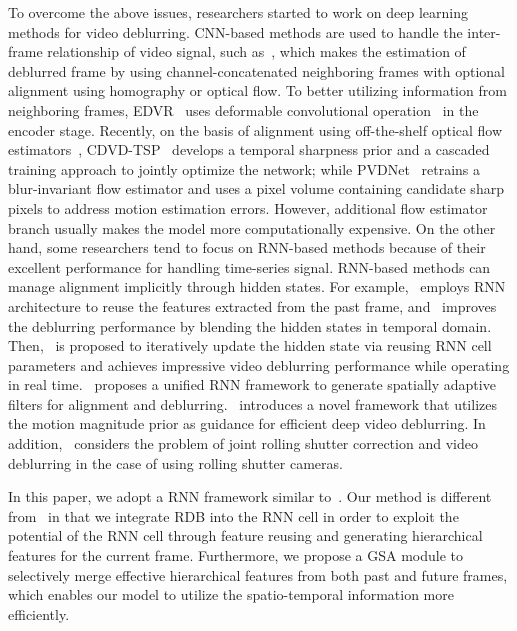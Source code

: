 \documentclass[twocolumn]{svjour3}          \smartqed  \usepackage{graphicx}
\begin{document}
To overcome the above issues, researchers started to work on deep learning methods for video deblurring. CNN-based methods are used to handle the inter-frame relationship of video signal, such as~\cite{su2017deep}, which makes the estimation of deblurred frame by using channel-concatenated neighboring frames with optional alignment using homography or optical flow. To better utilizing information from neighboring frames, EDVR~\cite{wang2019edvr} uses deformable convolutional operation~\cite{zhu2019deformable} in the encoder stage. Recently, on the basis of alignment using off-the-shelf optical flow estimators~\cite{sun2018pwc,hui2018liteflownet}, CDVD-TSP~\cite{pan2020cascaded} develops a temporal sharpness prior and a cascaded training approach to jointly optimize the network; while PVDNet~\cite{son2021recurrent} retrains a blur-invariant flow estimator and uses a pixel volume containing candidate sharp pixels to address motion estimation errors. However, additional flow estimator branch usually makes the model more computationally expensive. On the other hand, some researchers tend to focus on RNN-based methods because of their excellent performance for handling time-series signal. RNN-based methods can manage alignment implicitly through hidden states. For example,~\cite{wieschollek2017learning} employs RNN architecture to reuse the features extracted from the past frame, and~\cite{hyun2017online} improves the deblurring performance by blending the hidden states in temporal domain. Then,~\cite{nah2019recurrent} is proposed to iteratively update the hidden state via reusing RNN cell parameters and achieves impressive video deblurring performance while operating in real time.~\cite{zhou2019spatio} proposes a unified RNN framework to generate spatially adaptive filters for alignment and deblurring.~\cite{wang2022efficient} introduces a novel framework that utilizes the motion magnitude prior as guidance for efficient deep video deblurring. In addition,~\cite{zhong2021towards} considers the problem of joint rolling shutter correction and video deblurring in the case of using rolling shutter cameras.

In this paper, we adopt a RNN framework similar to~\cite{nah2019recurrent}. Our method is different from~\cite{nah2019recurrent} in that we integrate RDB into the RNN cell in order to exploit the potential of the RNN cell through feature reusing and generating hierarchical features for the current frame. Furthermore, we propose a GSA module to selectively merge effective hierarchical features from both past and future frames, which enables our model to utilize the spatio-temporal information more efficiently.
\end{document}
